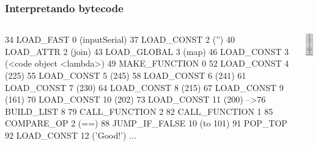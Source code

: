 \documentclass[9pt, notes=hide]{beamer}
\begin{document}
\begin{frame}[fragile]
    \frametitle{Interpretando bytecode}
        \begin{columns}[T]
            \begin{column}{.8\textwidth}
\begin{python}
   34  LOAD_FAST          0 (inputSerial)
   37  LOAD_CONST         2 ('')
   40  LOAD_ATTR          2 (join)
   43  LOAD_GLOBAL        3 (map)
   46  LOAD_CONST         3 (<code object <lambda>)
   49  MAKE_FUNCTION      0
   52  LOAD_CONST         4 (225)
   55  LOAD_CONST         5 (245)
   58  LOAD_CONST         6 (241)
   61  LOAD_CONST         7 (230)
   64  LOAD_CONST         8 (215)
   67  LOAD_CONST         9 (161)
   70  LOAD_CONST        10 (202)
   73  LOAD_CONST        11 (200)
-->76  BUILD_LIST         8
   79  CALL_FUNCTION      2
   82  CALL_FUNCTION      1
   85  COMPARE_OP         2 (==)
   88  JUMP_IF_FALSE     10 (to 101)
   91  POP_TOP
   92  LOAD_CONST        12 ('Good!')
   ...
\end{python}

            \end{column}
            \begin{column}{.3\textwidth}
                \includegraphics[width=2.5cm]{images/stack-0.png}
            \end{column}
        \end{columns}

\end{frame}
\end{document}
